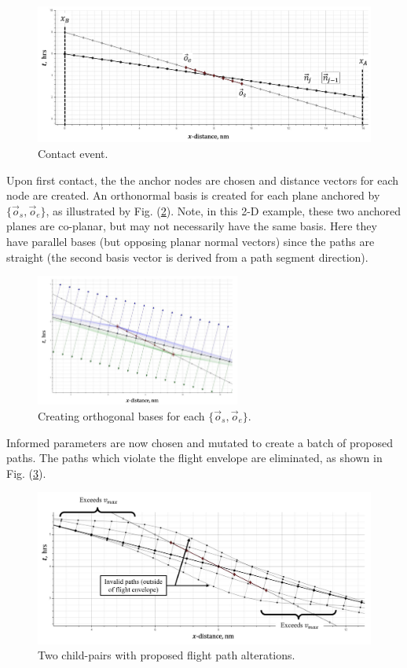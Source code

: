 \documentclass[conf]{new-aiaa}
\begin{document}
\begin{figure}[hbt!]
\centering
\includegraphics[width=1\textwidth]{figs/contact-event-2d}
\caption{Contact event.}
\label{contact-event-2d}
\end{figure}

Upon first contact, the the anchor nodes are chosen and distance vectors for each node are created. An orthonormal basis is created for each plane anchored by $\{\vec{o}_s, \vec{o}_e\}$, as illustrated by Fig. (\ref{ortho-creation-2d}). Note, in this 2-D example, these two anchored planes are co-planar, but may not necessarily have the same basis. Here they have parallel bases (but opposing planar normal vectors) since the paths are straight (the second basis vector is derived from a path segment direction).

\begin{figure}[hbt!]
\centering
\includegraphics[width=0.6\textwidth]{figs/ortho-creation-2d}
\caption{Creating orthogonal bases for each $\{\vec{o}_s, \vec{o}_e\}$.}
\label{ortho-creation-2d}
\end{figure}

Informed parameters are now chosen and mutated to create a batch of proposed paths. The paths which violate the flight envelope are eliminated, as shown in Fig. (\ref{batch-2d}).

\begin{figure}[hbt!]
\centering
\includegraphics[width=1\textwidth]{figs/batch-2d}
\caption{Two child-pairs with proposed flight path alterations.}
\label{batch-2d}
\end{figure}
\end{document}
